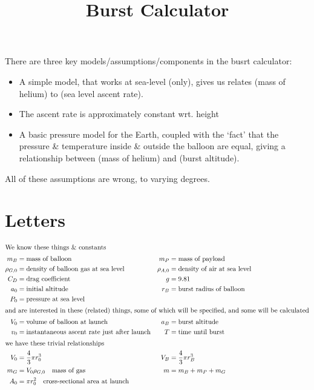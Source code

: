 \documentclass{article}
\begin{document}
\title{Burst Calculator}

There are three key models/assumptions/components in the busrt calculator:

\begin{itemize}
    \item A simple model, that works at sea-level (only), gives us
          relates (mass of helium) to (sea level ascent rate).
    \item The ascent rate is approximately constant wrt. height
    \item A basic pressure model for the Earth, coupled with the `fact'
          that the pressure \& temperature inside \& outside the balloon are
          equal, giving a relationship between (mass of helium) and (burst altitude).
\end{itemize}

All of these assumptions are wrong, to varying degrees.

\setcounter{section}{-1}
\section{Letters}

\begin{align*}
\intertext{We know these things \& constants}
    m_B &= \text{mass of balloon} &
    m_P &= \text{mass of payload} \\
    \rho_{G,0} &= \text{density of balloon gas at sea level} &
    \rho_{A,0} &= \text{density of air at sea level } \\
    C_D &= \text{drag coefficient} &
    g &= 9.81 \\
    a_0 &= \text{initial altitude} &
    r_B &= \text{burst radius of balloon} \\
    P_0 &= \text{pressure at sea level} \\
%
\intertext{and are interested in these (related) things, some of which
           will be specified, and some will be calculated}
    V_0 &= \text{volume of balloon at launch} &
    a_B &= \text{burst altitude} \\
    v_0 &= \text{instantaneous ascent rate just after launch} &
    T &= \text{time until burst} \\
%
\intertext{we have these trivial relationships}
    V_0 &= \frac{4}{3} \pi r_0^3 &
    V_B &= \frac{4}{3} \pi r_B^3 \\
    m_G &= V_0 \rho_{G,0} \quad \text{mass of gas} &
    m &= m_B + m_P + m_G \\
    A_0 &= \pi r_0^2 \quad \text{cross-sectional area at launch} \\
%
\end{align*}
\end{document}

